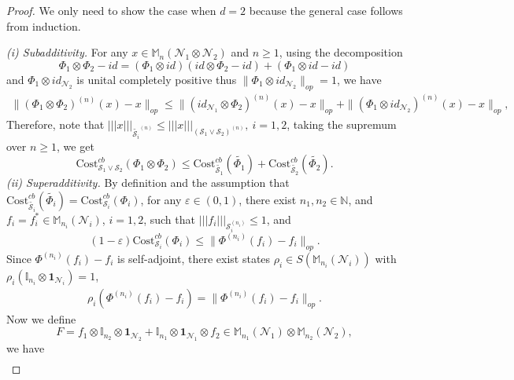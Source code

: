 \documentclass[11pt,reqno]{amsart}
\numberwithin{equation}{section}
\newcommand{\mb}{\mathbb}
\newcommand{\wt}{\widetilde}
\newcommand{\mc}{\mathcal}
\newcommand{\Cost}{\mathrm{Cost}}
\begin{document}
\begin{proof}
We only need to show the case when $d=2$ because the general case follows from induction. 

\noindent \emph{(i) Subadditivity.} For any $x \in \mb M_n(\mc N_1 \otimes \mc N_2)$ and $n \ge 1$, using the decomposition 
\begin{equation}
    \Phi_1 \otimes \Phi_2 - id = (\Phi_1 \otimes id)(id \otimes \Phi_2 - id) + (\Phi_1 \otimes id - id)
\end{equation}
and $\Phi_1 \otimes id_{\mc N_2}$ is unital completely positive thus $\|\Phi_1 \otimes id_{\mc N_2}\|_{op} = 1$, we have 
\begin{align*}
    \|(\Phi_1 \otimes \Phi_2)^{(n)}(x) - x\|_{op} \le \|(id_{\mc N_1} \otimes \Phi_2)^{(n)}(x) - x\|_{op} + \|(\Phi_1 \otimes id_{\mc N_2})^{(n)}(x) - x\|_{op},
\end{align*}
Therefore, note that $|||x|||_{\wt {\mc S_i}^{(n)}} \le |||x|||_{(\mc S_1 \vee \mc S_2)^{(n)}},\ i = 1,2$, taking the supremum over $n\ge 1$, we get
\begin{equation}
    \Cost_{\mc S_1 \vee \mc S_2}^{cb}(\Phi_1 \otimes \Phi_2) \le \Cost_{\wt {\mc S_1}}^{cb}(\wt {\Phi_1}) + \Cost_{\wt {\mc S_2}}^{cb}(\wt {\Phi_2}).
\end{equation}
\emph{(ii) Superadditivity.} By definition and the assumption that $\Cost_{\wt {\mc S_i}}^{cb}(\wt {\Phi_i}) = \Cost_{\mc S_i}^{cb}(\Phi_i)$, for any $\varepsilon\in (0,1)$, there exist $n_1,n_2 \in \mb N$, and $f_i = f_i^* \in \mb M_{n_i}(\mc N_i)$, $i=1,2$, such that $|||f_i|||_{\mc S_i^{(n_i)}}\le 1$, and
\begin{equation}\label{superadditivity:key step 1}
(1-\varepsilon)\Cost_{\mc S_i}^{cb}(\Phi_i)\le \|\Phi^{(n_i)}(f_i) - f_i\|_{op}.
\end{equation}
Since $\Phi^{(n_i)}(f_i) - f_i$ is self-adjoint, there exist states $\rho_i \in S(\mb M_{n_i}(\mc N_i))$ with $\rho_i(\mb I_{n_i} \otimes \textbf{1}_{\mc N_i}) = 1$,
\begin{align}\label{superadditivity:key step 2}
    \rho_i\left(\Phi^{(n_i)}(f_i) - f_i\right)= \|\Phi^{(n_i)}(f_i) - f_i\|_{op}.
\end{align}
Now we define 
\begin{equation}
F = f_1 \otimes \mb I_{n_2}\otimes \textbf{1}_{\mc N_2} + \mb I_{n_1} \otimes \textbf{1}_{\mc N_1} \otimes f_2 \in \mb M_{n_1}(\mc N_1) \otimes \mb M_{n_2}(\mc N_2),
\end{equation}
we have
\begin{align*}

\end{align*}
\end{proof}
\end{document}
